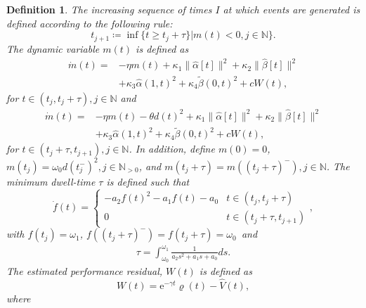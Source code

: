 \documentclass[letterpaper, 10 pt, conference]{ieeeconf}
\newtheorem{definition}{Definition}
\begin{document}
\begin{definition}\label{def:etc}
The increasing sequence of times $I$ at which events are generated is defined according to the following rule:
\begin{equation}
    t_{j+1}\coloneqq \inf\{t\geq t_j + \tau\}\vert m(t)<0, j\in\mathbb{N}\}.\label{tj+1}
\end{equation}
    The dynamic variable $m(t)$ is defined as
    \begin{equation}
    \begin{aligned}
        \dot m(t) =& -\eta m(t) + \kappa_1\|\hat \alpha[t]\|^2 + \kappa_2 \|\hat \beta[t]\|^2\\&  + \kappa_3 \hat\alpha(1,t)^2+ \kappa_4 \tilde \beta(0,t)^2 + cW(t),\label{m1}
    \end{aligned}
    \end{equation}
    for $t\in(t_j,t_j+\tau),j\in\mathbb{N}$ and
    \begin{equation}
    \begin{aligned}
        \dot m(t) =& -\eta m(t) -\theta d(t)^2 + \kappa_1 \|\hat \alpha[t]\|^2 + \kappa_2 \|\hat \beta[t]\|^2\\&  + \kappa_3 \hat\alpha(1,t)^2+ \kappa_4 \tilde \beta(0,t)^2 + cW(t),\label{m2}
    \end{aligned}
    \end{equation}
    for $t\in(t_j+\tau,t_{j+1}),j\in\mathbb{N}$. In addition, define $m(0)=0$, $m(t_j)=\omega_0d(t_j^-)^2,j\in\mathbb{N}_{>0}$, and $m(t_j+\tau)=m((t_j+\tau)^-),j\in\mathbb{N}$. The minimum dwell-time $\tau$ is defined such that
    \begin{equation}\label{f}
    \dot f(t) =
        \begin{cases}
            -a_2f(t)^2 - a_1f(t) - a_0&t\in(t_j,t_j+\tau)\\
            0&t\in(t_j+\tau,t_{j+1})
        \end{cases},
    \end{equation}
    with $f(t_j)=\omega_1$, $f((t_j+\tau)^-)=f(t_j+\tau)=\omega_0$\, and 
    \begin{align}
        \tau = \int_{\omega_0}^{\omega_1}\frac{1}{a_2s^2 + a_1s + a_0}ds.\label{tau}
    \end{align}The estimated performance residual, $W(t)$ is defined as
    \begin{equation}
        W(t) = \mathrm{e}^{-\gamma t}\varrho(t) - \hat V(t),\label{w}
    \end{equation}
    where
    \begin{align}

\end{align}
\end{definition}
\end{document}
